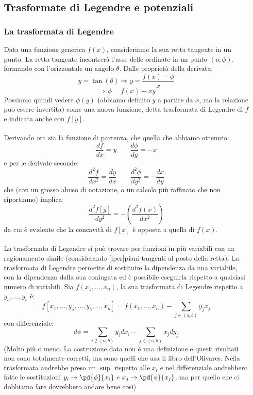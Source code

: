 \documentclass{article}
\begin{document}
\subsection{Trasformate di Legendre e potenziali}
\subsubsection{La trasformata di Legendre}
Data una funzione generica $f(x)$, consideriamo la sua retta tangente in un punto. La retta tangente incontrerà l'asse delle ordinate in un punto $(o,\phi)$, formando con l'orizzontale un angolo $\theta$. Dalle proprietà della derivata:
$$ y = \tan(\theta) \Rightarrow y =  \frac{f(x)-\phi}{x} $$
$$ \Rightarrow \phi = f(x) - xy $$
Possiamo quindi vedere $\phi(y)$ (abbiamo definito $y$ a partire da $x$, ma la relazione può essere invertita) come una nuova funzione, detta trasformata di Legendre di $f$ e indicata anche con $f[y]$.\\\\
Derivando ora sia la funzione di partenza, che quella che abbiamo ottenuto:
$$ \frac{df}{dx} = y \qquad \frac{d\phi}{dy} = -x $$
e per le derivate seconde:
$$ \frac{d^2f}{dx^2}=\frac{dy}{dx} \qquad \frac{d^2\phi}{dy^2}=-\frac{dx}{dy} $$
che (con un grosso abuso di notazione, o un calcolo più raffinato che non riportiamo) implica:
$$ \frac{d^2f[y]}{dy^2} = -\left( \frac{d^2f(x)}{dx^2} \right) $$
da cui è evidente che la concavità di $f[x]$ è opposta a quella di $f(x)$.\\\\
La trasformata di Legendre si può trovare per funzioni in più variabili con un ragionamento simile (considerando [iper]piani tangenti al posto della retta). La trasformata di Legendre permette di sostituire la dipendenza da una variabile, con la dipendenza dalla sua coniugata ed è possibile eseguirla rispetto a qualsiasi numero di variabili. Sia $f(x_1,...,x_n)$, la sua trasformata di Legendre rispetto a $y_a,...,y_b$ è:
$$ f[x_1,...,y_a,...,y_b,...,x_n] = f(x_1,...,x_n) - \sum_{j\in(a,b)} y_jx_j $$
con differenziale:
$$ d\phi = \sum_{i\notin(a,b)} y_idx_i - \sum_{j\in(a,b)} x_jdy_j $$
(Molto più o meno. La costruzione data non è una definizione e questi risultati non sono totalmente corretti, ma sono quelli che usa il libro dell'Olivares. Nella trasformata andrebbe preso un $\sup$ rispetto alle $x_i$ e nel differenziale andrebbero fatte le sostituzioni $y_i\rightarrow\pd{\phi}{x_i}$ e $x_j\rightarrow\pd{\phi}{x_j}$, ma per quello che ci dobbiamo fare dovrebbero andare bene così)
\end{document}
